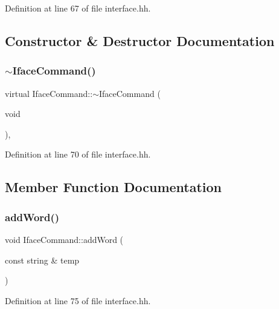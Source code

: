 Definition at line 67 of file interface.\+hh.



\subsection{Constructor \& Destructor Documentation}
\mbox{\label{class_iface_command_a65ac5123dcffa1b002ad628971da6b1f}} 
\subsubsection{\texorpdfstring{$\sim$IfaceCommand()}{~IfaceCommand()}}
{\footnotesize\ttfamily virtual Iface\+Command\+::$\sim$\+Iface\+Command (\begin{DoxyParamCaption}\item[{void}]{ }\end{DoxyParamCaption})\hspace{0.3cm}{\ttfamily [inline]}, {\ttfamily [virtual]}}



Definition at line 70 of file interface.\+hh.



\subsection{Member Function Documentation}
\mbox{\label{class_iface_command_a6b4cf9ece6453e1436aad4f8ab49b9d4}} 
\subsubsection{\texorpdfstring{addWord()}{addWord()}}
{\footnotesize\ttfamily void Iface\+Command\+::add\+Word (\begin{DoxyParamCaption}\item[{const string \&}]{temp }\end{DoxyParamCaption})\hspace{0.3cm}{\ttfamily [inline]}}



Definition at line 75 of file interface.\+hh.

